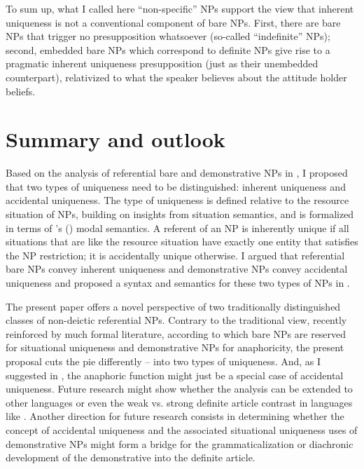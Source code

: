 \documentclass[output=paper,colorlinks,citecolor=brown,newtxmath]{langscibook}
\begin{document}
\noindent To sum up, what I called here ``non-specific'' NPs support the view that inherent uniqueness is not a conventional component of bare NPs. First, there are bare NPs that trigger no presupposition whatsoever (so-called ``indefinite'' NPs); second, embedded bare NPs which correspond to definite NPs give rise to a pragmatic inherent uniqueness presupposition (just as their unembedded counterpart), relativized to what the speaker believes about the attitude holder beliefs.

\section{Summary and outlook}\label{simik:sec:summary}

Based on the analysis of referential bare and demonstrative NPs in , I proposed that two types of uniqueness need to be distinguished: inherent uniqueness and accidental uniqueness. The type of uniqueness is defined relative to the resource situation of NPs, building on insights from situation semantics, and is formalized in terms of \citeauthor{Kratzer1981}'s (\citeyear{Kratzer1981,Kratzer1991}) modal semantics. A referent of an NP is inherently unique if all situations that are like the resource situation have exactly one entity that satisfies the NP restriction; it is accidentally unique otherwise. I argued that referential bare NPs convey inherent uniqueness and demonstrative NPs convey accidental uniqueness and proposed a syntax and semantics for these two types of NPs in .

The present paper offers a novel perspective of two traditionally distinguished classes of non-deictic referential NPs. Contrary to the traditional view, recently reinforced by much formal literature, according to which bare NPs are reserved for situational uniqueness and demonstrative NPs for anaphoricity, the present proposal cuts the pie differently -- into two types of uniqueness. And, as I suggested in , the anaphoric function might just be a special case of accidental uniqueness. Future research might show whether the analysis can be extended to other  languages or even the weak vs. strong definite article contrast in languages like . Another direction for future research consists in determining whether the concept of accidental uniqueness and the associated situational uniqueness uses of demonstrative NPs might form a bridge for the grammaticalization or diachronic development of the demonstrative into the definite article.
\end{document}
